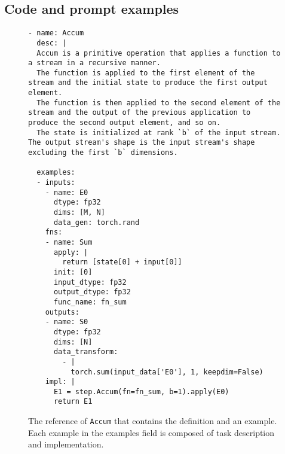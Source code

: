 \subsection{Code and prompt examples}
\lstset{
    breaklines=true,
    breakatwhitespace=true  %
}
\begin{figure}[htbp]
\centering
\begin{lstlisting}[language=step, mathescape=true, basicstyle=\scriptsize\ttfamily]
- name: Accum
  desc: |
  Accum is a primitive operation that applies a function to a stream in a recursive manner.
  The function is applied to the first element of the stream and the initial state to produce the first output element.
  The function is then applied to the second element of the stream and the output of the previous application to produce the second output element, and so on.
  The state is initialized at rank `b` of the input stream. The output stream's shape is the input stream's shape excluding the first `b` dimensions. 

  examples:
  - inputs:
    - name: E0
      dtype: fp32
      dims: [M, N]
      data_gen: torch.rand
    fns:
    - name: Sum
      apply: |
        return [state[0] + input[0]]
      init: [0]
      input_dtype: fp32
      output_dtype: fp32
      func_name: fn_sum
    outputs:
    - name: S0
      dtype: fp32
      dims: [N]
      data_transform:
        - |
          torch.sum(input_data['E0'], 1, keepdim=False)
    impl: |
      E1 = step.Accum(fn=fn_sum, b=1).apply(E0)
      return E1
\end{lstlisting}
\caption{The reference of \texttt{Accum} that contains the definition and an example. Each example in the examples field is composed of task description and implementation.}
\label{fig:reference-accum}
\end{figure}

